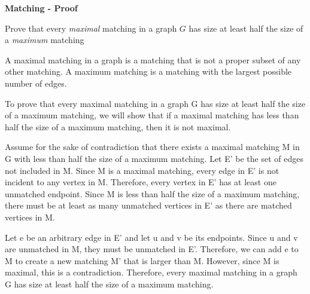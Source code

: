 \question \textbf{Matching - Proof}

Prove that every \textit{maximal} matching in a graph $G$ has size at least half the size of a \textit{maximum} matching

\begin{solution}

    A maximal matching in a graph is a matching that is not a proper subset of any other matching. A maximum matching is a matching with the largest possible number of edges.

    To prove that every maximal matching in a graph G has size at least half the size of a maximum matching, we will show that if a maximal matching has less than half the size of a maximum matching, then it is not maximal.
    
    Assume for the sake of contradiction that there exists a maximal matching M in G with less than half the size of a maximum matching. Let E' be the set of edges not included in M. Since M is a maximal matching, every edge in E' is not incident to any vertex in M. Therefore, every vertex in E' has at least one unmatched endpoint. Since M is less than half the size of a maximum matching, there must be at least as many unmatched vertices in E' as there are matched vertices in M.
    
    Let e be an arbitrary edge in E' and let u and v be its endpoints. Since u and v are unmatched in M, they must be unmatched in E'. Therefore, we can add e to M to create a new matching M' that is larger than M. However, since M is maximal, this is a contradiction. Therefore, every maximal matching in a graph G has size at least half the size of a maximum matching.
    
\end{solution}
